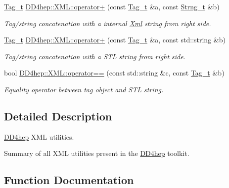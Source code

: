 \begin{DoxyCompactItemize}
\hyperlink{class_d_d4hep_1_1_x_m_l_1_1_tag__t}{Tag\+\_\+t} \hyperlink{group___d_d4_h_e_p___x_m_l_ga64cd4f3e74d5147d8a0dda8d7dc5b372}{D\+D4hep\+::\+X\+M\+L\+::operator+} (const \hyperlink{class_d_d4hep_1_1_x_m_l_1_1_tag__t}{Tag\+\_\+t} \&a, const \hyperlink{class_d_d4hep_1_1_x_m_l_1_1_strng__t}{Strng\+\_\+t} \&b)
\begin{DoxyCompactList}\small\item\em Tag/string concatenation with a internal \hyperlink{union_xml}{Xml} string from right side. \end{DoxyCompactList}\item 
\hyperlink{class_d_d4hep_1_1_x_m_l_1_1_tag__t}{Tag\+\_\+t} \hyperlink{group___d_d4_h_e_p___x_m_l_ga4296bedbf278d7bbd894b9e07bedf79a}{D\+D4hep\+::\+X\+M\+L\+::operator+} (const \hyperlink{class_d_d4hep_1_1_x_m_l_1_1_tag__t}{Tag\+\_\+t} \&a, const std\+::string \&b)
\begin{DoxyCompactList}\small\item\em Tag/string concatenation with a S\+TL string from right side. \end{DoxyCompactList}\item 
bool \hyperlink{group___d_d4_h_e_p___x_m_l_ga147592045f1692bc1bce671299c71a77}{D\+D4hep\+::\+X\+M\+L\+::operator==} (const std\+::string \&c, const \hyperlink{class_d_d4hep_1_1_x_m_l_1_1_tag__t}{Tag\+\_\+t} \&b)
\begin{DoxyCompactList}\small\item\em Equality operator between tag object and S\+TL string. \end{DoxyCompactList}\end{DoxyCompactItemize}


\subsection{Detailed Description}
\hyperlink{namespace_d_d4hep}{D\+D4hep} X\+ML utilities. 

Summary of all X\+ML utilities present in the \hyperlink{namespace_d_d4hep}{D\+D4hep} toolkit. 

\subsection{Function Documentation}
\hypertarget{group___d_d4_h_e_p___x_m_l_ga38094fef4f65786fdece09b69b41d07b}{}\label{group___d_d4_h_e_p___x_m_l_ga38094fef4f65786fdece09b69b41d07b} 
